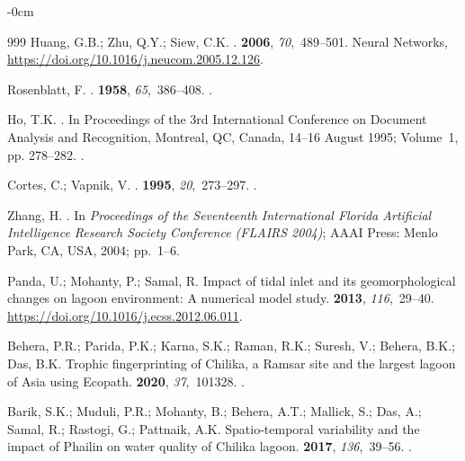 \documentclass[jmse,article,accept,pdftex,oneauthor]{Definitions/mdpi}
\begin{document}
\begin{adjustwidth}{-\extralength}{0cm}
\begin{thebibliography}{999}
Huang, G.B.; Zhu, Q.Y.; Siew, C.K.
.
 {\bf 2006}, {\em 70},~489--501.
\newblock Neural Networks,
  {\url{https://doi.org/10.1016/j.neucom.2005.12.126}}.

Rosenblatt, F.
.
 {\bf 1958}, {\em 65},~386--408.
.

Ho, T.K.
.
\newblock In Proceedings of the 3rd International Conference on
  Document Analysis and Recognition, {Montreal, QC, Canada, 14--16 August} 1995; Volume~1, pp. 278--282.
.

Cortes, C.; Vapnik, V.
.
 {\bf 1995}, {\em 20},~273--297.
.

Zhang, H.
.
\newblock In \emph{Proceedings of the Seventeenth International Florida Artificial Intelligence Research Society Conference (FLAIRS 2004)};  {AAAI Press: Menlo Park, CA, USA}, 2004; pp.~1--6.

Panda, U.; Mohanty, P.; Samal, R.
\newblock Impact of tidal inlet and its geomorphological changes on lagoon
  environment: A numerical model study.
 {\bf 2013}, {\em
  116},~29--40.
  {\url{https://doi.org/10.1016/j.ecss.2012.06.011}}.

Behera, P.R.; Parida, P.K.; Karna, S.K.; Raman, R.K.; Suresh, V.; Behera, B.K.;
  Das, B.K.
\newblock Trophic fingerprinting of Chilika, a Ramsar site and the largest
  lagoon of Asia using Ecopath.
 {\bf 2020}, {\em
  37},~101328.
.

Barik, S.K.; Muduli, P.R.; Mohanty, B.; Behera, A.T.; Mallick, S.; Das, A.;
  Samal, R.; Rastogi, G.; Pattnaik, A.K.
\newblock Spatio-temporal variability and the impact of Phailin on water
  quality of Chilika lagoon.
 {\bf 2017}, {\em 136},~39--56.
.


\end{thebibliography}
\end{adjustwidth}
\end{document}
